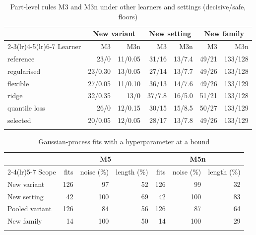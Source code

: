 \documentclass[pdflatex,sn-basic]{sn-jnl}
\newcommand{\tabsize}{\fontsize{8}{9.5}\selectfont}
\begin{document}
\begin{table}[tbp]
\tabsize
\setlength{\tabcolsep}{4pt}
\caption{Part-level rules M3 and M3n under other learners and settings (decisive/safe, floors)}\label{tab:tuning}
\begin{tabular}{@{}lrrrrrr@{}}
\toprule
 & \multicolumn{2}{c}{New variant} & \multicolumn{2}{c}{New setting} & \multicolumn{2}{c}{New family} \\
\cmidrule(lr){2-3}\cmidrule(lr){4-5}\cmidrule(lr){6-7}
Learner & M3 & M3n & M3 & M3n & M3 & M3n \\
\midrule
reference & 23/0 & 11/0.05 & 31/16 & 13/7.4 & 49/21 & 133/128 \\
regularised & 23/0.30 & 13/0.05 & 27/14 & 13/7.7 & 49/26 & 133/128 \\
flexible & 27/0.05 & 11/0.10 & 36/13 & 14/7.6 & 49/26 & 133/129 \\
ridge & 32/0.35 & 13/0 & 37/7.8 & 16/5.0 & 51/21 & 133/128 \\
quantile loss & 26/0 & 12/0.15 & 30/15 & 15/8.5 & 50/27 & 133/129 \\
selected & 20/0.05 & 12/0.05 & 28/17 & 13/7.8 & 49/26 & 133/129 \\
\botrule
\end{tabular}
\end{table}

\begin{table}[tbp]
\tabsize
\setlength{\tabcolsep}{5pt}
\caption{Gaussian-process fits with a hyperparameter at a bound}\label{tab:gp}
\begin{tabular}{@{}lrrrrrr@{}}
\toprule
 & \multicolumn{3}{c}{M5} & \multicolumn{3}{c}{M5n} \\
\cmidrule(lr){2-4}\cmidrule(lr){5-7}
Scope & fits & noise (\%) & length (\%) & fits & noise (\%) & length (\%) \\
\midrule
New variant & 126 & 97 & 52 & 126 & 99 & 32 \\
New setting & 42 & 100 & 69 & 42 & 100 & 83 \\
Pooled variant & 126 & 84 & 56 & 126 & 87 & 64 \\
New family & 14 & 100 & 50 & 14 & 100 & 29 \\
\botrule
\end{tabular}
\end{table}
\end{document}
